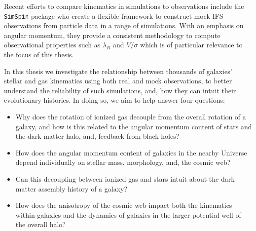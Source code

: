 Recent efforts to compare kinematics in simulations to observations include the \texttt{SimSpin} package \citep{harborne2019, harborne2020} who create a flexible framework to construct mock IFS observations from particle data in a range of simulations. With an emphasis on angular momentum, they provide a consistent methodology to compute observational properties such as $\lambda_R$ and $V/\sigma$ which is of particular relevance to the focus of this thesis.

In this thesis we investigate the relationship between thousands of galaxies' stellar and gas kinematics using both real and mock observations, to better understand the reliability of such simulations, and, how they can intuit their evolutionary histories. In doing so, we aim to help answer four questions:

\begin{itemize}
    
    \item Why does the rotation of ionized gas decouple from the overall rotation of a galaxy, and how is this related to the angular momentum content of stars and the dark matter halo, and, feedback from black holes?
    
    \item How does the angular momentum content of galaxies in the nearby Universe depend individually on stellar mass, morphology, and, the cosmic web?
    
    \item Can this decoupling between ionized gas and stars intuit about the dark matter assembly history of a galaxy?

    \item How does the anisotropy of the cosmic web impact both the kinematics within galaxies and the dynamics of galaxies in the larger potential well of the overall halo?

\end{itemize}

